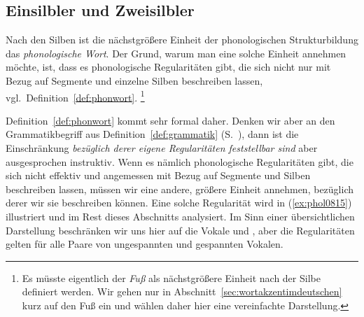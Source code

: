 \subsection{Einsilbler und Zweisilbler}

\label{sec:einsilblerzweisilbler}


Nach den Silben ist die nächstgrößere Einheit der phonologischen Strukturbildung das \textit{phonologische Wort}.
Der Grund, warum man eine solche Einheit annehmen möchte, ist, dass es phonologische Regularitäten gibt, die sich nicht nur mit Bezug auf Segmente und einzelne Silben beschreiben lassen, vgl.\ Definition~\ref{def:phonwort}.%
\footnote{Es müsste eigentlich der \textit{Fuß} als nächstgrößere Einheit nach der Silbe definiert werden.
Wir gehen nur in Abschnitt~\ref{sec:wortakzentimdeutschen} kurz auf den Fuß ein und wählen daher hier eine vereinfachte Darstellung.}


Definition~\ref{def:phonwort} kommt sehr formal daher.
Denken wir aber an den Grammatikbegriff aus Definition~\ref{def:grammatik} (S.~\pageref{def:grammatik}), dann ist die Einschränkung \textit{bezüglich derer eigene Regularitäten feststellbar sind} aber ausgesprochen instruktiv.
Wenn es nämlich phonologische Regularitäten gibt, die sich nicht effektiv und angemessen mit Bezug auf Segmente und Silben beschreiben lassen, müssen wir eine andere, größere Einheit annehmen, bezüglich derer wir sie beschreiben können.
Eine solche Regularität wird in (\ref{ex:phol0815}) illustriert und im Rest dieses Abschnitts analysiert.
Im Sinn einer übersichtlichen Darstellung beschränken wir uns hier auf die Vokale \textipa{[I]} und \textipa{[i]}, aber die Regularitäten gelten für alle Paare von ungespannten und gespannten Vokalen.


\begin{exe}
  \ex\label{ex:phol0815}
  \begin{xlist}
    \ex{\label{ex:phol0815b} *\textipa{[knI]}}
    \ex{\label{ex:phol0815f} *\textipa{[vi:Nk]}}
    \ex{\label{ex:phol0815k} *\textipa{[vi:Nk.t@]}}
  \end{xlist}
\end{exe}

